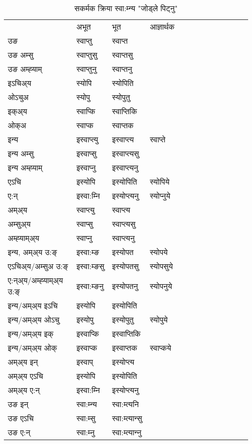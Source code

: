 \begin{table}[H]
\label{opt.vt} \centering
\caption{सकर्मक क्रिया  स्वा:म्‍न्य  "जोड्ले पिट्नु"  }
\begin{tabular}{l|l|l|l|l|l|l|l|l|l|l|l|l}  \toprule
&अभूत & भूत & आज्ञार्थक \\ 
उङ &स्वाप्‍तु &स्वाप्‍त \\ 
उङ अम्सु&स्वाप्‍तुसु &स्वाप्‍तसु \\ 
उङ अम्ह्‍याम्&स्वाप्‍तुनु &स्वाप्‍तनु \\ 
इऽचिअ्य &स्योपि &स्योपिति   \\ 
ओऽचुअ        &स्योपु &स्योपुतु   \\ 
इक्अ्य&स्वाप्कि &स्वाप्‍तिकि   \\ 
ओक्अ &स्वाप्क &स्वाप्‍तक   \\ 
इन्य & इस्वाप्‍त्यु  & इस्वाप्‍त्य &स्वाप्‍ते  \\ 
इन्य अम्सु& इस्वाप्सु  & इस्वाप्‍त्यसु   \\ 
इन्य अम्ह्‍याम्& इस्वाप्‍नु  & इस्वाप्‍त्यनु   \\ 
एऽचि & इस्योपि & इस्योपिति &स्योपिये    \\ 
ए:न् & इस्वा:म्‍नि  & इस्योप्‍त्यनु &स्योप्‍नुये  \\ 
अम्अ्य & स्वाप्‍त्यु  & स्वाप्‍त्य  \\ 
अम्सुअ्य & स्वाप्सु & स्वाप्‍त्यसु  \\ 
अम्ह्‍याम्अ्य & स्वाप्‍नु  & स्वाप्‍त्यनु \\ 
\midrule
इन्य, अम्अ्य उ:ङ्‌ &इस्वा:म्ङ &इस्योपत &स्योपये \\ 
एऽचिअ्य/अम्सुअ उ:ङ्‌ &इस्वा:म्ङसु &इस्योपतसु &स्योपसुये \\ 
ए:न्अ्य/अम्ह्‍याम्अ्य उ:ङ्‌ &इस्वा:म्ङनु &इस्योपतनु &स्योपनुये \\ 
इन्य/अम्अ्य इऽचि &इस्योपि &इस्योपिति    \\ 
इन्य/अम्अ्य ओऽचु &इस्योपु &इस्योपुतु  &स्योपुये  \\ 
इन्य/अम्अ्य इक् &इस्वाप्कि &इस्वाप्‍तिकि   \\ 
इन्य/अम्अ्य ओक् &इस्वाप्क &इस्वाप्‍तक  &स्वाप्कये  \\ 
अम्अ्य इन् & इस्वाप् & इस्योप्‍त्य   \\ 
अम्अ्य एऽचि & इस्योपि & इस्योपिति    \\ 
अम्अ्य ए:न् & इस्वा:म्‍नि  & इस्योप्‍त्यनु  \\ 
\midrule
उङ इन् & स्वा:म्‍न्य  & स्वा:म्त्यनि  \\ 
उङ एऽचि & स्वा:म्सु  & स्वा:म्त्यान्सु   \\ 
उङ ए:न्& स्वा:म्‍नु  & स्वा:म्त्यान्‍नु   \\ 
\bottomrule
\end{tabular}
\end{table}


